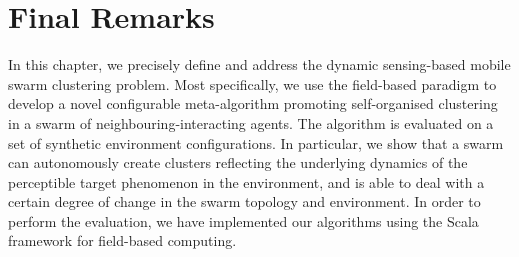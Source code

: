 
\section{Final Remarks}
\label{s:conc}


In this chapter, we precisely define and address
 the dynamic sensing-based mobile swarm clustering problem.
%
Most specifically,
 we use the field-based paradigm
 to develop a novel configurable meta-algorithm
 promoting self-organised clustering in a swarm
 of neighbouring-interacting agents.
%
The algorithm is evaluated on a set of synthetic environment configurations.
%
In particular, we show that a swarm can autonomously
 create clusters reflecting the underlying dynamics of the  perceptible target phenomenon in the environment,
 and is able to deal with a certain degree of change in the swarm topology and environment.
%
In order to perform the evaluation, we have implemented our algorithms using the \scafi{} Scala framework for field-based computing.

